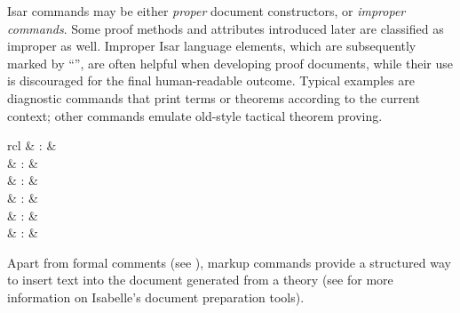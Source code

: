\begin{isabellebody}
\begin{isamarkuptext}
  \medskip Isar commands may be either \emph{proper} document
  constructors, or \emph{improper commands}.  Some proof methods and
  attributes introduced later are classified as improper as well.
  Improper Isar language elements, which are subsequently marked by
  ``\isa{{\isachardoublequote}\isactrlsup {\isacharasterisk}{\isachardoublequote}}'', are often helpful when developing proof
  documents, while their use is discouraged for the final
  human-readable outcome.  Typical examples are diagnostic commands
  that print terms or theorems according to the current context; other
  commands emulate old-style tactical theorem proving.%
\end{isamarkuptext}%
\isamarkuptrue%
%
\isamarkuptrue%
%
\isamarkuptrue%
%
\begin{isamarkuptext}%
\begin{matharray}{rcl}
    \hypertarget{command.chapter}{\hyperlink{command.chapter}{\mbox{}}} & : &  \\
    \hypertarget{command.section}{\hyperlink{command.section}{\mbox{}}} & : &  \\
    \hypertarget{command.subsection}{\hyperlink{command.subsection}{\mbox{}}} & : &  \\
    \hypertarget{command.subsubsection}{\hyperlink{command.subsubsection}{\mbox{}}} & : &  \\
    \hypertarget{command.text}{\hyperlink{command.text}{\mbox{}}} & : &  \\
    \hypertarget{command.text-raw}{\hyperlink{command.text-raw}{\mbox{}}} & : &  \\
  \end{matharray}

  Apart from formal comments (see ), markup
  commands provide a structured way to insert text into the document
  generated from a theory (see \cite{isabelle-sys} for more
  information on Isabelle's document preparation tools).


\end{isamarkuptext}
\end{isabellebody}
